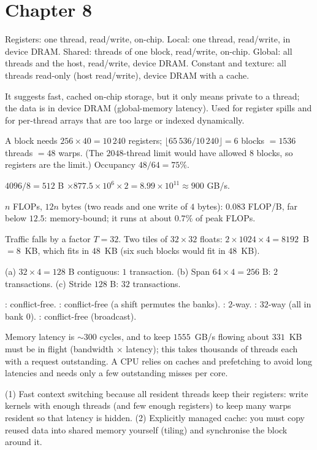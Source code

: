 \section*{Chapter 8}
\begin{description}[leftmargin=1.2cm,labelwidth=1cm,itemsep=3pt]
  \item[8.1] Registers: one thread, read/write, on-chip. Local: one thread, read/write, in device DRAM. Shared: threads of one block, read/write, on-chip. Global: all threads and the host, read/write, device DRAM. Constant and texture: all threads read-only (host read/write), device DRAM with a cache.
  \item[8.2] It suggests fast, cached on-chip storage, but it only means private to a thread; the data is in device DRAM (global-memory latency). Used for register spills and for per-thread arrays that are too large or indexed dynamically.
  \item[8.3] A block needs $256\times40=10\,240$ registers; $\lfloor65\,536/10\,240\rfloor=6$ blocks $=1536$ threads $=48$ warps. (The $2048$-thread limit would have allowed $8$ blocks, so registers are the limit.) Occupancy $48/64=75\%$.
  \item[8.4] $4096/8=512$ B $\times877.5\times10^{6}\times2=8.99\times10^{11}\approx900$ GB/s.
  \item[8.5] $n$ FLOPs, $12n$ bytes (two reads and one write of $4$ bytes): $0.083$ FLOP/B, far below $12.5$: memory-bound; it runs at about $0.7\%$ of peak FLOPs.
  \item[8.6] Traffic falls by a factor $T=32$. Two tiles of $32\times32$ floats: $2\times1024\times4=8192$~B $=8$~KB, which fits in $48$~KB (six such blocks would fit in $48$~KB).
  \item[8.7] (a) $32\times4=128$ B contiguous: $1$ transaction. (b) Span $64\times4=256$ B: $2$ transactions. (c) Stride $128$ B: $32$ transactions.
  \item[8.8] : conflict-free. : conflict-free (a shift permutes the banks). : $2$-way. : $32$-way (all in bank $0$). : conflict-free (broadcast).
  \item[8.9] Memory latency is $\sim300$ cycles, and to keep $1555$~GB/s flowing about $331$~KB must be in flight (bandwidth $\times$ latency); this takes thousands of threads each with a request outstanding. A CPU relies on caches and prefetching to avoid long latencies and needs only a few outstanding misses per core.
  \item[8.10] (1) Fast context switching because all resident threads keep their registers: write kernels with enough threads (and few enough registers) to keep many warps resident so that latency is hidden. (2) Explicitly managed cache: you must copy reused data into shared memory yourself (tiling) and synchronise the block around it.
\end{description}

